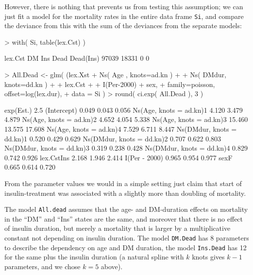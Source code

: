 \documentclass[a4paper,twoside,12pt]{report}
\begin{document}
However, there is nothing that prevents us from testing this
assumption; we can just fit a model for the mortality rates in the
entire data frame \texttt{Si}, and compare the deviance from this with
the sum of the deviances from the separate models:
\begin{Schunk}
\begin{Sinput}
> with( Si, table(lex.Cst) )
\end{Sinput}
\begin{Soutput}
lex.Cst
       DM       Ins      Dead Dead(Ins) 
    97039     18331         0         0 
\end{Soutput}
\begin{Sinput}
> All.Dead <- glm( (lex.Xst %in% c("Dead(Ins)","Dead")) ~
+                                           Ns( Age  , knots=ad.kn ) +
+                                           Ns( DMdur, knots=dd.kn ) +
+                                           lex.Cst +
+                                           I(Per-2000) + sex,
+                family=poisson, offset=log(lex.dur),
+                data = Si )
> round( ci.exp( All.Dead ), 3 )
\end{Sinput}
\begin{Soutput}
                          exp(Est.)   2.5%  97.5%
(Intercept)                   0.049  0.043  0.056
Ns(Age, knots = ad.kn)1       4.120  3.479  4.879
Ns(Age, knots = ad.kn)2       4.652  4.054  5.338
Ns(Age, knots = ad.kn)3      15.460 13.575 17.608
Ns(Age, knots = ad.kn)4       7.529  6.711  8.447
Ns(DMdur, knots = dd.kn)1     0.520  0.429  0.629
Ns(DMdur, knots = dd.kn)2     0.707  0.622  0.803
Ns(DMdur, knots = dd.kn)3     0.319  0.238  0.428
Ns(DMdur, knots = dd.kn)4     0.829  0.742  0.926
lex.CstIns                    2.168  1.946  2.414
I(Per - 2000)                 0.965  0.954  0.977
sexF                          0.665  0.614  0.720
\end{Soutput}
\end{Schunk}
From the parameter values we would in a simple setting just claim that
start of insulin-treatment was associated with a slightly more than
doubling of mortality.

The model \texttt{All.dead} assumes that the age- and DM-duration
effects on mortality in the ``DM'' and ``Ins'' states are the same,
and moreover that there is no effect of insulin duration, but merely a
mortality that is larger by a multiplicative constant not depending on
insulin duration. The model \texttt{DM.Dead} has 8 parameters to
describe the dependency on age and DM duration, the model
\texttt{Ins.Dead} has 12 for the same plus the insulin duration (a
natural spline with $k$ knots gives $k-1$ parameters, and we chose
$k=5$ above).
\end{document}
